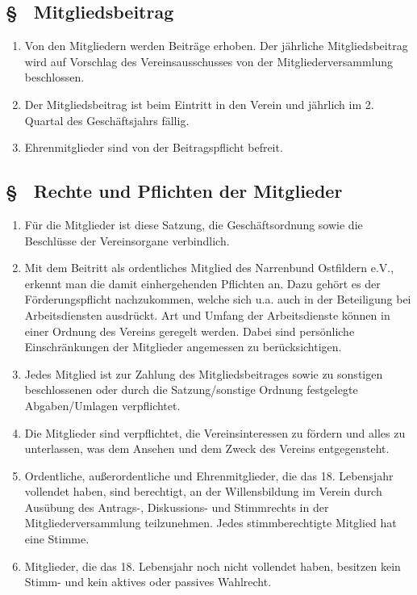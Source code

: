 \subsection{§ \thesaparagraphcounter\ Mitgliedsbeitrag} \label{sa:par:mitgliedsbeitrag}
\begin{enumerate}
    \item \label{sa:abs:8axdzp} Von den Mitgliedern werden Beiträge erhoben. Der jährliche Mitgliedsbeitrag wird auf Vorschlag des Vereinsausschusses von der Mitgliederversammlung beschlossen.

    \item \label{sa:abs:5nu8m1} Der Mitgliedsbeitrag ist beim Eintritt in den Verein und jährlich im 2. Quartal des Geschäftsjahrs fällig.

    \item \label{sa:abs:8bsxx7} Ehrenmitglieder sind von der Beitragspflicht befreit.
\end{enumerate}

\subsection{§ \thesaparagraphcounter\ Rechte und Pflichten der Mitglieder} \label{sa:par:rechte_pflichten_mitglieder}
\begin{enumerate}
    \item \label{sa:abs:gxgh9g} Für die Mitglieder ist diese Satzung, die Geschäftsordnung sowie die Beschlüsse der Vereinsorgane verbindlich.

    \item \label{sa:abs:unlrjd} Mit dem Beitritt als ordentliches Mitglied des Narrenbund Ostfildern e.V., erkennt man die damit einhergehenden Pflichten an. Dazu gehört es der Förderungspflicht nachzukommen, welche sich u.a. auch in der Beteiligung bei Arbeitsdiensten ausdrückt. Art und Umfang der Arbeitsdienste können in einer Ordnung des Vereins geregelt werden. Dabei sind persönliche Einschränkungen der Mitglieder angemessen zu berücksichtigen.

    \item \label{sa:abs:toed7o} Jedes Mitglied ist zur Zahlung des Mitgliedsbeitrages sowie zu sonstigen beschlossenen oder durch die Satzung/sonstige Ordnung festgelegte Abgaben/Umlagen verpflichtet. 

    \item \label{sa:abs:x7at49} Die Mitglieder sind verpflichtet, die Vereinsinteressen zu fördern und alles zu unterlassen, was dem Ansehen und dem Zweck des Vereins entgegensteht.

    \item \label{sa:abs:e5cqfb} Ordentliche, außerordentliche und Ehrenmitglieder, die das 18. Lebensjahr vollendet haben, sind berechtigt, an der Willensbildung im Verein durch Ausübung des Antrags-, Diskussions- und Stimmrechts in der Mitgliederversammlung teilzunehmen. Jedes stimmberechtigte Mitglied hat eine Stimme.

    \item \label{sa:abs:x2aojd} Mitglieder, die das 18. Lebensjahr noch nicht vollendet haben, besitzen kein Stimm- und kein aktives oder passives Wahlrecht.
\end{enumerate}

